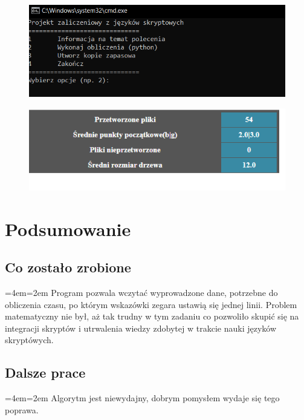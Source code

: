 \documentclass[12pt,a4paper]{article}
\newenvironment{blockquote}{%
  \par%
  \medskip
  \leftskip=4em\rightskip=2em%
  \noindent\ignorespaces}{%
  \par\medskip}
\begin{document}
	
	\begin{figure}[!htb]
	    \centering
	    \includegraphics{dzialanie.PNG}
	\end{figure}
		\begin{figure}[!htb]
	    \centering
	    \includegraphics{htl.PNG}
	\end{figure}
	

	
	\newpage
	
    \newpage
	\section{Podsumowanie}
	
	\subsection{Co zostało zrobione}
	\begin{blockquote}
        Program pozwala wczytać wyprowadzone dane, potrzebne do obliczenia czasu, po którym wskazówki zegara ustawią się  jednej linii. Problem matematyczny nie był, aż tak trudny w tym zadaniu co pozwoliło skupić się na integracji skryptów i utrwalenia wiedzy zdobytej w trakcie nauki języków skryptówych.
    \end{blockquote}
    \subsection{Dalsze prace}
	\begin{blockquote}
        Algorytm jest niewydajny, dobrym pomysłem wydaje się tego poprawa.
    \end{blockquote}

    	
\end{document}
